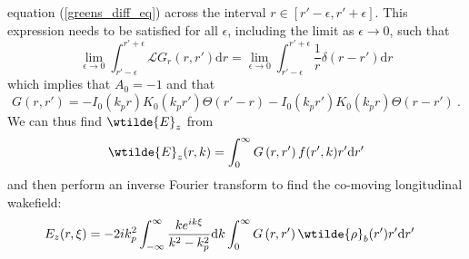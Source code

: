 equation (\ref{greens_diff_eq}) across the interval $r\in\left[r'-\epsilon, r'+\epsilon \right]$. This expression needs to be satisfied for all $\epsilon$, including the limit as $\epsilon\to 0$, such that
\begin{equation}
\lim_{\epsilon\to 0}\int_{r'-\epsilon}^{r'+\epsilon}\mathscr{L}G_r(r,r')\mathrm{d}r= \lim_{\epsilon\to 0}\int_{r'-\epsilon}^{r'+\epsilon}\frac{1}{r}\delta(r-r')\mathrm{d}r
 \end{equation}
which implies that $A_0=-1$ and that
\begin{equation}
G\left(r,r'\right)=- I_0(k_pr)K_0(k_pr')\Theta(r'-r)-I_0(k_pr')K_0(k_pr)\Theta(r-r')~.
\end{equation}
We can thus find $\wtilde{E}_z$ from 
\begin{equation}
\wtilde{E}_z(r,k)=\int_{0}^{\infty}G\left(r,r'\right)f(r',k)r'\mathrm{d}r'
\end{equation}
and then perform an inverse Fourier transform to find the co-moving longitudinal wakefield:
\begin{align}
E_z(r,\xi)&=-{2ik_p^2}\int_{-\infty}^{\infty}\frac{ke^{ik\xi}}{k^2-k_p^2}\mathrm{d}k\int_0^{\infty}G\left(r,r'\right)\wtilde{\rho}_b(r')r'\mathrm{d}r'
\label{e_z}
\end{align}
